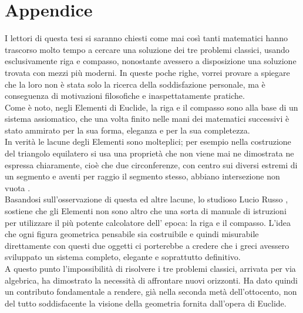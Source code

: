 
\chapter*{Appendice}



I lettori di questa tesi si saranno chiesti come mai così tanti matematici hanno trascorso molto tempo a cercare una soluzione dei tre problemi classici, usando esclusivamente riga e compasso, nonostante avessero a disposizione una soluzione trovata con mezzi più moderni. In queste poche righe, vorrei provare a spiegare che la loro non è stata solo la ricerca della soddisfazione personale, ma è conseguenza di motivazioni filosofiche e inaspettatamente pratiche. \\

Come è noto, negli Elementi di Euclide, la riga e il compasso sono alla base di un sistema assiomatico, che una volta finito nelle mani dei matematici successivi è stato ammirato per la sua forma, eleganza e per la sua completezza. \\
In verità le lacune degli Elementi sono molteplici; per esempio nella costruzione del triangolo equilatero si usa una proprietà che non viene mai ne dimostrata ne espressa chiaramente, cioè che due circonferenze, con centro sui diversi estremi di un segmento e aventi per raggio il segmento stesso, abbiano intersezione non vuota \cite{Shea}. \\
Basandosi sull'osservazione di questa ed altre lacune, lo studioso Lucio Russo \cite{Russo}, sostiene che gli Elementi non sono altro che una sorta di manuale di istruzioni per utilizzare il più potente calcolatore dell' epoca: la riga e il compasso.
L'idea che ogni figura geometrica pensabile sia costruibile e quindi misurabile direttamente con questi due oggetti ci porterebbe a credere che i greci avessero sviluppato un sistema completo, elegante e soprattutto definitivo.\\

A questo punto l'impossibilità di risolvere i tre problemi classici, arrivata per via algebrica, ha dimostrato la necessità di affrontare nuovi orizzonti. Ha dato quindi un contributo fondamentale a rendere, già nella seconda metà dell'ottocento, non del tutto soddisfacente la visione della geometria fornita dall'opera di Euclide. 

